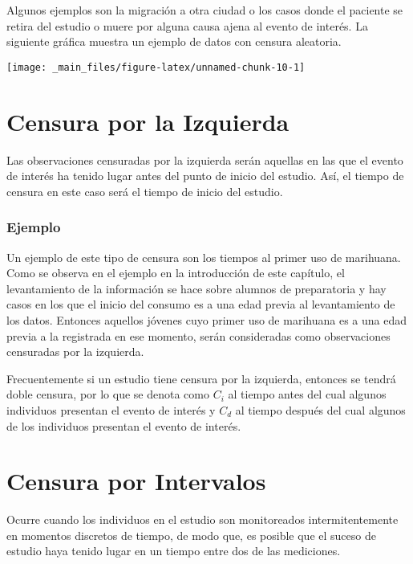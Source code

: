 \documentclass[
  a4paper,
  oneside,
  openany]{book}
\begin{document}
Algunos ejemplos son la migración a otra ciudad o los casos donde el paciente se retira del estudio o muere por alguna causa ajena al evento de interés. La siguiente gráfica muestra un ejemplo de datos con censura aleatoria.

\begin{center}\texttt{[image: \_main\_files/figure-latex/unnamed-chunk-10-1]} \end{center}

\hypertarget{censura-por-la-izquierda}{%
\section{Censura por la Izquierda}\label{censura-por-la-izquierda}}

Las observaciones censuradas por la izquierda serán aquellas en las que el evento de interés ha tenido lugar antes del punto de inicio del estudio. Así, el tiempo de censura en este caso será el tiempo de inicio del estudio.

\hypertarget{ejemplo-3}{%
\subsubsection*{Ejemplo}\label{ejemplo-3}}


Un ejemplo de este tipo de censura son los tiempos al primer uso de marihuana. Como se observa en el ejemplo en la introducción de este capítulo, el levantamiento de la información se hace sobre alumnos de preparatoria y hay casos en los que el inicio del consumo es a una edad previa al levantamiento de los datos. Entonces aquellos jóvenes cuyo primer uso de marihuana es a una edad previa a la registrada en ese momento, serán consideradas como observaciones censuradas por la izquierda.

Frecuentemente si un estudio tiene censura por la izquierda, entonces se tendrá doble censura, por lo que se denota como \(C_i\) al tiempo antes del cual algunos individuos presentan el evento de interés y \(C_d\) al tiempo después del cual algunos de los individuos presentan el evento de interés.

\hypertarget{censura-por-intervalos}{%
\section{Censura por Intervalos}\label{censura-por-intervalos}}

Ocurre cuando los individuos en el estudio son monitoreados intermitentemente en momentos discretos de tiempo, de modo que, es posible que el suceso de estudio haya tenido lugar en un tiempo entre dos de las mediciones.
\end{document}
